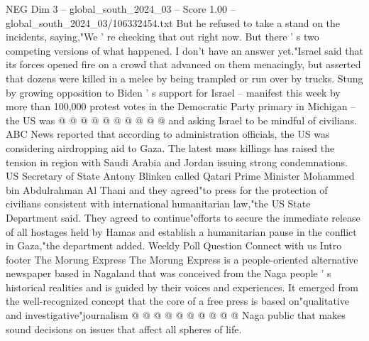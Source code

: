 \begin{textsample}{NEG Dim 3 – global\_south\_2024\_03 – Score 1.00 – global\_south\_2024\_03/106332454.txt}
But he refused to take a stand on the incidents, saying,"We ' re checking that out right now.
But there ' s two competing versions of what happened.
I don't have an answer yet."Israel said that its forces opened fire on a crowd that advanced on them menacingly, but asserted that dozens were killed in a melee by being trampled or run over by trucks.
Stung by growing opposition to Biden ' s support for Israel -- manifest this week by more than 100,000 protest votes in the Democratic Party primary in Michigan -- the US was @ @ @ @ @ @ @ @ @ @ and asking Israel to be mindful of civilians.
ABC News reported that according to administration officials, the US was considering airdropping aid to Gaza.
The latest mass killings has raised the tension in region with Saudi Arabia and Jordan issuing strong condemnations.
US Secretary of State Antony Blinken called Qatari Prime Minister Mohammed bin Abdulrahman Al Thani and they agreed"to press for the protection of civilians consistent with international humanitarian law,"the US State Department said.
They agreed to continue"efforts to secure the immediate release of all hostages held by Hamas and establish a humanitarian pause in the conflict in Gaza,"the department added.
Weekly Poll Question Connect with us Intro footer The Morung Express The Morung Express is a people-oriented alternative newspaper based in Nagaland that was conceived from the Naga people ' s historical realities and is guided by their voices and experiences.
It emerged from the well-recognized concept that the core of a free press is based on"qualitative and investigative"journalism @ @ @ @ @ @ @ @ @ @ Naga public that makes sound decisions on issues that affect all spheres of life.

\end{textsample}
